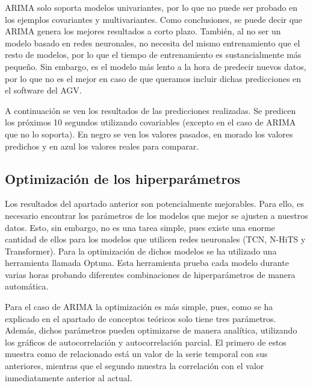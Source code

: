 ARIMA solo soporta modelos univariantes, por lo que no puede ser probado en los ejemplos covariantes y multivariantes.
Como conclusiones, se puede decir que ARIMA genera los mejores resultados a corto plazo. También, al no ser un modelo 
basado en redes neuronales, no necesita del mismo entrenamiento que el resto de modelos, por lo que el tiempo de entrenamiento 
es sustancialmente más pequeño. Sin embargo, es el modelo más lento a la hora de predecir nuevos datos, por lo que no es 
el mejor en caso de que queramos incluir dichas predicciones en el software del AGV.

A continuación se ven los resultados de las predicciones realizadas. Se predicen los próximos
10 segundos utilizando covariables (excepto en el caso de ARIMA que no lo soporta). En negro se 
ven los valores pasados, en morado los valores predichos y en azul los valores reales para comparar.


\subsection{Optimización de los hiperparámetros}

Los resultados del apartado anterior son potencialmente mejorables. Para ello, es necesario encontrar los parámetros de los 
modelos que mejor se ajusten a nuestros datos. Esto, sin embargo, no es una tarea simple, pues existe una enorme 
cantidad de ellos para los modelos que utilicen redes neuronales (TCN, N-HiTS y Transformer). Para la optimización 
de dichos modelos se ha utilizado una herramienta llamada Optuna. Esta herramienta prueba cada modelo durante 
varias horas probando diferentes combinaciones de hiperparámetros de manera automática.

Para el caso de ARIMA la optimización es más simple, pues, como se ha explicado en el apartado de conceptos 
teóricos solo tiene tres parámetros. Además, dichos parámetros pueden optimizarse de manera analítica, utilizando 
los gráficos de autocorrelación y autocorrelación parcial. El primero de estos muestra como de relacionado está 
un valor de la serie temporal con sus anteriores, mientras que el segundo muestra la correlación con el valor 
inmediatamente anterior al actual.

